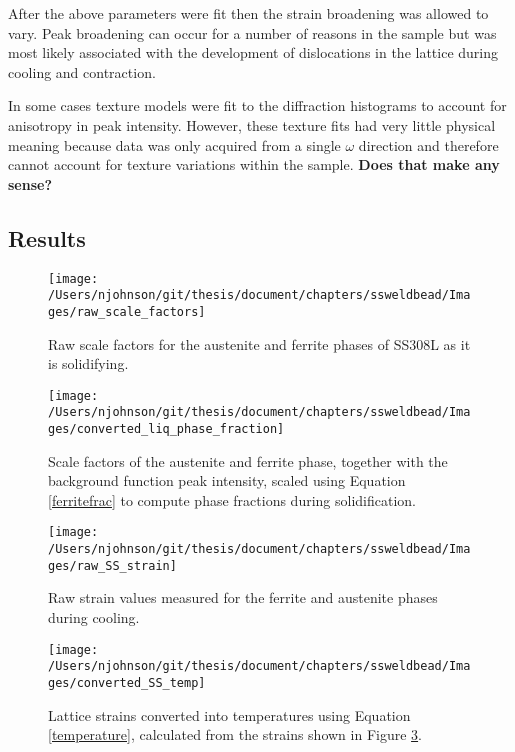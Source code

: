 After the above parameters were fit then the strain broadening was allowed to vary. Peak broadening can occur for a number of reasons in the sample but was most likely associated with the development of dislocations in the lattice during cooling and contraction.

In some cases texture models were fit to the diffraction histograms to account for anisotropy in peak intensity. However, these texture fits had very little physical meaning because data was only acquired from a single $\omega$ direction and therefore cannot account for texture variations within the sample. \textbf{Does that make any sense?}

\subsection{Results}
\begin{figure}
	\texttt{[image: /Users/njohnson/git/thesis/document/chapters/ssweldbead/Images/raw\_scale\_factors]}
	\caption{Raw scale factors for the austenite and ferrite phases of SS308L as it is solidifying.}
	\label{raw_scale_factors}
\end{figure}

\begin{figure}
	\texttt{[image: /Users/njohnson/git/thesis/document/chapters/ssweldbead/Images/converted\_liq\_phase\_fraction]}
	\caption{Scale factors of the austenite and ferrite phase, together with the background function peak intensity, scaled using Equation \ref{ferritefrac} to compute phase fractions during solidification.}
	\label{SS_phase_fractions}
\end{figure}

\begin{figure}
	\texttt{[image: /Users/njohnson/git/thesis/document/chapters/ssweldbead/Images/raw\_SS\_strain]}
	\caption{Raw strain values measured for the ferrite and austenite phases during cooling.}
	\label{raw_SS_strain}
\end{figure}

\begin{figure}
	\texttt{[image: /Users/njohnson/git/thesis/document/chapters/ssweldbead/Images/converted\_SS\_temp]}
	\caption{Lattice strains converted into temperatures using Equation \ref{temperature}, calculated from the strains shown in Figure \ref{raw_SS_strain}.}
	\label{converted_SS_temp}
\end{figure}

